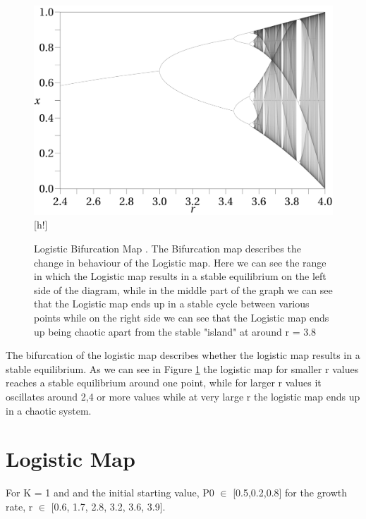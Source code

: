 \documentclass[11pt,a4paper]{CLabBookTemplate} %
\begin{document}
\begin{figure}
	\centering
	\includegraphics[width = 120mm]{Figures/LogisticBifurcationMap.png}[h!]
	\caption{Logistic Bifurcation Map \cite{LBM}. The Bifurcation map describes the change in behaviour of the Logistic map. Here we can see the range in which the Logistic map results in a stable equilibrium on the left side of the diagram, while in the middle part of the graph we can see that the Logistic map ends up in a stable cycle between various points while on the right side we can see that the Logistic map ends up being chaotic apart from the stable "island" at around r = 3.8}
	\label{fig:LogisticBifurcationMap}
\end{figure}

The bifurcation of the logistic map describes whether the logistic map results in a stable equilibrium. As we can see in Figure \ref{fig:LogisticBifurcationMap} the logistic map for smaller r values reaches a stable equilibrium around one point, while for larger r values it oscillates around 2,4 or more values while at very large r the logistic map ends up in a chaotic system. 

\newpage
\section{Logistic Map}
For K = 1 and and the initial starting value, P0 $\in$ [0.5,0.2,0.8] for the growth rate, r $\in$ [0.6, 1.7, 2.8, 3.2, 3.6, 3.9]. \par 
\end{document}

